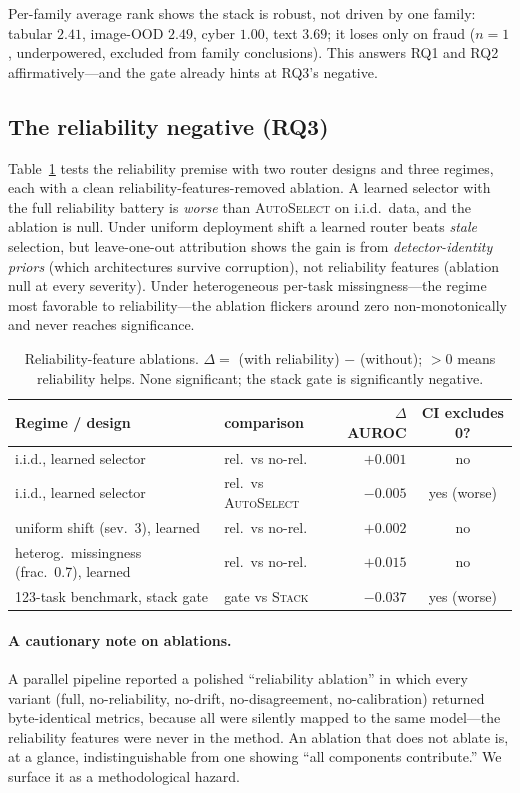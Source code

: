 \documentclass[11pt]{article}
\newcommand{\stack}{\textsc{Stack}}
\newcommand{\auto}{\textsc{AutoSelect}}
\begin{document}
Per-family average rank shows the stack is robust, not driven by one family: tabular
$2.41$, image-OOD $2.49$, cyber $1.00$, text $3.69$; it loses only on fraud ($n{=}1$,
underpowered, excluded from family conclusions). This answers RQ1 and RQ2
affirmatively---and the gate already hints at RQ3's negative.

\subsection{The reliability negative (RQ3)}\label{sec:negative}
Table~\ref{tab:negative} tests the reliability premise with two router designs and
three regimes, each with a clean reliability-features-removed ablation. A learned
selector with the full reliability battery is \emph{worse} than \auto{} on i.i.d.\
data, and the ablation is null. Under uniform deployment shift a learned router beats
\emph{stale} selection, but leave-one-out attribution shows the gain is from
\emph{detector-identity priors} (which architectures survive corruption), not
reliability features (ablation null at every severity). Under heterogeneous per-task
missingness---the regime most favorable to reliability---the ablation flickers around
zero non-monotonically and never reaches significance.

\begin{table}[H]\centering
\caption{Reliability-feature ablations. $\Delta=$ (with reliability) $-$ (without);
$>0$ means reliability helps. None significant; the stack gate is significantly
negative.}
\label{tab:negative}
\begin{tabular}{llrc}
\toprule
Regime / design & comparison & $\Delta$AUROC & CI excludes 0? \\
\midrule
i.i.d., learned selector & rel.\ vs no-rel.\ & $+0.001$ & no \\
i.i.d., learned selector & rel.\ vs \auto{} & $-0.005$ & yes (worse) \\
uniform shift (sev.\ 3), learned & rel.\ vs no-rel.\ & $+0.002$ & no \\
heterog.\ missingness (frac.\ 0.7), learned & rel.\ vs no-rel.\ & $+0.015$ & no \\
123-task benchmark, stack gate & gate vs \stack{} & $-0.037$ & yes (worse) \\
\bottomrule
\end{tabular}
\end{table}

\paragraph{A cautionary note on ablations.} A parallel pipeline reported a polished
``reliability ablation'' in which every variant (full, no-reliability, no-drift,
no-disagreement, no-calibration) returned byte-identical metrics, because all were
silently mapped to the same model---the reliability features were never in the method.
An ablation that does not ablate is, at a glance, indistinguishable from one showing
``all components contribute.'' We surface it as a methodological hazard.
\end{document}
